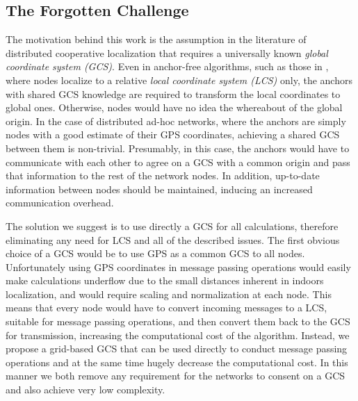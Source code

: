 \documentclass[10pt, final, journal]{IEEEtran}
\begin{document}
\subsection{The Forgotten Challenge}\label{motivation}
The motivation behind this work is the assumption in the literature of distributed cooperative localization that requires a universally known {\em global coordinate system (GCS)}. Even in anchor-free algorithms, such as those in \cite{Ihler:2004jq,priyantha2003anchor,shang2004improved}, where nodes localize to a relative {\em local coordinate system (LCS)} only, the anchors with shared GCS knowledge are required to transform the local coordinates to global ones. Otherwise, nodes would have no idea the whereabout of the global origin. In the case of distributed ad-hoc networks, where the anchors are simply nodes with a good estimate of their GPS coordinates, achieving a shared GCS between them is non-trivial. Presumably, in this case, the anchors would have to communicate with each other to agree on a GCS with a common origin and pass that information to the rest of the network nodes. In addition, up-to-date information between nodes should be maintained, inducing an increased communication overhead.

The solution we suggest is to use directly a GCS for all calculations, therefore eliminating any need for LCS and all of the described issues. The first obvious choice of a GCS would be to use GPS as a common GCS to all nodes. Unfortunately using GPS coordinates in message passing operations would easily make calculations underflow due to the small distances inherent in indoors localization, and would require  scaling and normalization at each node. This means that every node would have to convert incoming messages to a LCS, suitable for message passing operations, and then convert them back to the GCS for transmission, increasing the computational cost of the algorithm. Instead, we propose a grid-based GCS that can be used directly to conduct message passing operations and at the same time hugely decrease the computational cost. In this manner we both remove any requirement for the networks to consent on a GCS and also achieve very low complexity.
\end{document}
